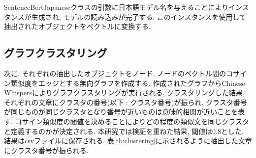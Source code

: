 


SentenceBertJapaneseクラスの引数に日本語モデル名を与えることによりインスタンスが生成され, モデルの読み込みが完了する. このインスタンスを使用して抽出されたオブジェクトをベクトルに変換する. 


\subsection{グラフクラスタリング}
次に, それぞれの抽出したオブジェクトをノード, ノードのベクトル間のコサイン類似度をエッジとする無向グラフを作成する. 作成されたグラフからChinese Whispersによりグラフクラスタリングが実行される. 
クラスタリングした結果, それぞれの文章にクラスタの番号(以下 : クラスタ番号)が振られ, クラスタ番号が同じものが同じクラスタとなり番号が近いものは意味的相関が近いことを表す. コサイン類似度の閾値を決めることによりどの程度の類似文を同じクラスタと定義するのかが決定される. 本研究では検証を重ねた結果, 閾値は0.8とした. 
結果はcsvファイルに保存される. 表\ref{tb:clustering}に示されるように抽出した文章にクラスタ番号が振られる. 

